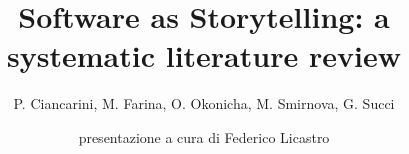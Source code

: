\documentclass{beamer}
\title[SaSSLR]{Software as Storytelling: a systematic literature review}
\subtitle{\small P. Ciancarini, M. Farina, O. Okonicha, M. Smirnova, G. Succi}
\author{presentazione a cura di Federico Licastro}
\begin{document}
\begin{frame}
  \titlepage
\end{frame}







\end{document}

